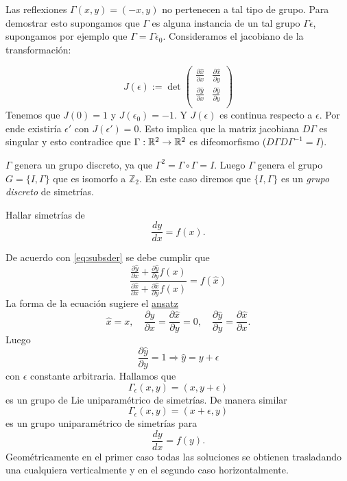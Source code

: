  Las reflexiones $\Gamma(x,y)=(-x,y)$  no pertenecen a tal tipo de  grupo. Para demostrar esto supongamos que  $\Gamma$ es alguna instancia de un tal grupo $\Gamma{\epsilon}$, supongamos por ejemplo que $\Gamma=\Gamma{\epsilon_0}$.  Consideramos el jacobiano de la transformación:

\[J(\epsilon):=\det\begin{pmatrix} \frac{\partial\hat{x}}{\partial x}&  \frac{\partial\hat{x}}{\partial y}\\
 \frac{\partial\hat{y}}{\partial x} &  \frac{\partial\hat{y}}{\partial y}\\
\end{pmatrix}
\]
 Tenemos que $J(0)=1$ y $J(\epsilon_0)=-1$. Y $J(\epsilon)$ es continua respecto a $\epsilon$. Por ende existiría $\epsilon'$ con $J(\epsilon')=0$. Esto implica que la matriz jacobiana $D\Gamma$ es singular y esto contradice que $\Gamma:\mathbb{R}^2\to \mathbb{R}^2$ es difeomorfismo ($D\Gamma D\Gamma^{-1}=I$).



 $\Gamma$  genera un grupo discreto, ya que $\Gamma^2=\Gamma\circ \Gamma=I$. Luego $\Gamma$ genera el grupo $G=\{I,\Gamma\}$ que es isomorfo a $\mathbb{Z}_2$. En este caso diremos que    $\{I,\Gamma\}$ es un \emph{grupo discreto} de simetrías.




 \begin{ejemplo} Hallar simetrías de
\[\frac{dy}{dx}=f(x).\]
\end{ejemplo}
De acuerdo con \eqref{eq:subsder} se debe cumplir que
 \[\frac{\frac{\partial\hat{y}}{\partial x}+\frac{\partial\hat{y}}{\partial y}f(x)}{\frac{\partial\hat{x}}{\partial x}+\frac{\partial\hat{x}}{\partial y}f(x)}=f(\hat{x})\]
La forma de la ecuación sugiere el  \href{http://es.wikipedia.org/wiki/Ansatz}{ansatz}
   \[\boxed{\hat{x}=x},\quad \frac{\partial\hat{y}}{\partial x}=\frac{\partial\hat{x}}{\partial y}=0,\quad
   \frac{\partial\hat{y}}{\partial y}=\frac{\partial\hat{x}}{\partial x}. \]
 Luego 
\[\frac{\partial\hat{y}}{\partial y}=1\Rightarrow \boxed{\hat{y}=y+\epsilon} \]
con $\epsilon$ constante arbitraria. Hallamos que
\[\Gamma_{\epsilon}(x,y)=(x,y+\epsilon)\]
es un grupo de Lie uniparamétrico de simetrías. De manera similar
\[\Gamma_{\epsilon}(x,y)=(x+\epsilon,y)\]
es un grupo uniparamétrico de simetrías para 
\[\frac{dy}{dx}=f(y).\]
Geométricamente en el primer caso todas las soluciones se obtienen trasladando una cualquiera verticalmente y en el segundo caso horizontalmente.



